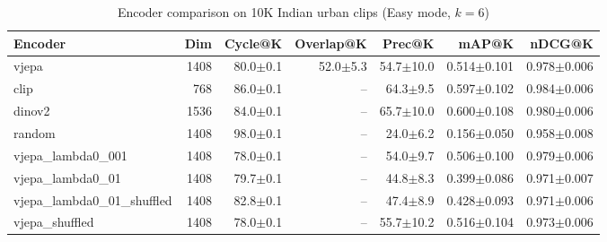 \begin{table}[ht]
\centering
\caption{Encoder comparison on 10K Indian urban clips (Easy mode, $k=6$)}
\label{tab:encoder_comparison}
\begin{tabular}{lrrrrrr}
\toprule
Encoder & Dim & Cycle@K & Overlap@K & Prec@K & mAP@K & nDCG@K \\
\midrule
vjepa & 1408 & 80.0{\tiny$\pm$0.1} & 52.0{\tiny$\pm$5.3} & 54.7{\tiny$\pm$10.0} & 0.514{\tiny$\pm$0.101} & 0.978{\tiny$\pm$0.006} \\
clip & 768 & 86.0{\tiny$\pm$0.1} & -- & 64.3{\tiny$\pm$9.5} & 0.597{\tiny$\pm$0.102} & 0.984{\tiny$\pm$0.006} \\
dinov2 & 1536 & 84.0{\tiny$\pm$0.1} & -- & 65.7{\tiny$\pm$10.0} & 0.600{\tiny$\pm$0.108} & 0.980{\tiny$\pm$0.006} \\
random & 1408 & 98.0{\tiny$\pm$0.1} & -- & 24.0{\tiny$\pm$6.2} & 0.156{\tiny$\pm$0.050} & 0.958{\tiny$\pm$0.008} \\
vjepa\_lambda0\_001 & 1408 & 78.0{\tiny$\pm$0.1} & -- & 54.0{\tiny$\pm$9.7} & 0.506{\tiny$\pm$0.100} & 0.979{\tiny$\pm$0.006} \\
vjepa\_lambda0\_01 & 1408 & 79.7{\tiny$\pm$0.1} & -- & 44.8{\tiny$\pm$8.3} & 0.399{\tiny$\pm$0.086} & 0.971{\tiny$\pm$0.007} \\
vjepa\_lambda0\_01\_shuffled & 1408 & 82.8{\tiny$\pm$0.1} & -- & 47.4{\tiny$\pm$8.9} & 0.428{\tiny$\pm$0.093} & 0.971{\tiny$\pm$0.006} \\
vjepa\_shuffled & 1408 & 78.0{\tiny$\pm$0.1} & -- & 55.7{\tiny$\pm$10.2} & 0.516{\tiny$\pm$0.104} & 0.973{\tiny$\pm$0.006} \\
\bottomrule
\end{tabular}
\end{table}